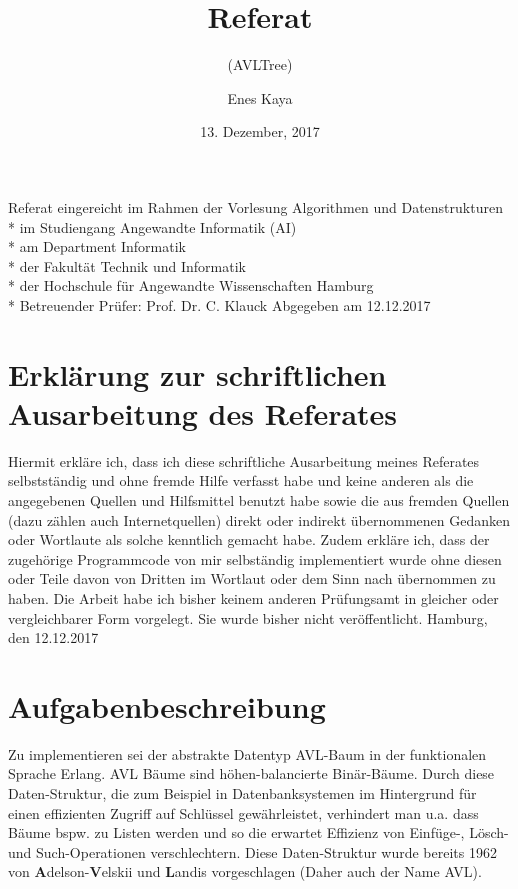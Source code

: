 \documentclass{article}
\title{Referat}
\subtitle{(AVLTree)}
\date{13. Dezember, 2017}
\author{Enes Kaya}
\begin{document}
  \maketitle
  \newpage

  Referat eingereicht im Rahmen der Vorlesung Algorithmen und Datenstrukturen\\*
  im Studiengang Angewandte Informatik (AI)\\*
  am Department Informatik\\*
  der Fakultät Technik und Informatik\\*
  der Hochschule für Angewandte Wissenschaften Hamburg\\*
  \newline
  Betreuender Prüfer: Prof. Dr. C. Klauck
  \newline
  Abgegeben am 12.12.2017
  
  \newpage
  \tableofcontents
  
  \newpage
  \section{Erklärung zur schriftlichen Ausarbeitung des Referates}
  
  Hiermit erkläre ich, dass ich diese schriftliche Ausarbeitung meines Referates selbstständig und ohne fremde Hilfe verfasst habe und keine anderen als die angegebenen Quellen und Hilfsmittel benutzt habe sowie die aus fremden Quellen (dazu zählen auch Internetquellen) direkt oder indirekt übernommenen Gedanken oder Wortlaute als solche kenntlich gemacht habe. Zudem erkläre ich, dass der zugehörige Programmcode von mir selbständig implementiert wurde ohne diesen oder Teile davon von Dritten im Wortlaut oder dem Sinn nach übernommen zu haben. Die Arbeit habe ich bisher keinem anderen Prüfungsamt in gleicher oder vergleichbarer Form vorgelegt. Sie wurde bisher nicht veröffentlicht.
  \newline
  \newline
  \newline
  Hamburg, den 12.12.2017
  
  \newpage
  \section{Aufgabenbeschreibung}
	Zu implementieren sei der abstrakte Datentyp AVL-Baum in der funktionalen Sprache Erlang. AVL Bäume sind höhen-balancierte Binär-Bäume. Durch diese Daten-Struktur, die zum Beispiel in Datenbanksystemen im Hintergrund für einen effizienten Zugriff auf Schlüssel gewährleistet, verhindert man u.a. dass Bäume bspw. zu Listen werden und so die erwartet Effizienz von Einfüge-, Lösch- und Such-Operationen verschlechtern.
	Diese Daten-Struktur wurde bereits 1962 von \textbf{A}delson-\textbf{V}elskii und \textbf{L}andis vorgeschlagen (Daher auch der Name AVL).
	
\end{document}
